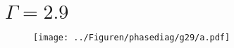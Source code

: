 \section{$\Gamma = 2.9$}

\begin{frame}
    \begin{figure}
        \center
        \texttt{[image: ../Figuren/phasediag/g29/a.pdf]}
    \end{figure}
\end{frame}